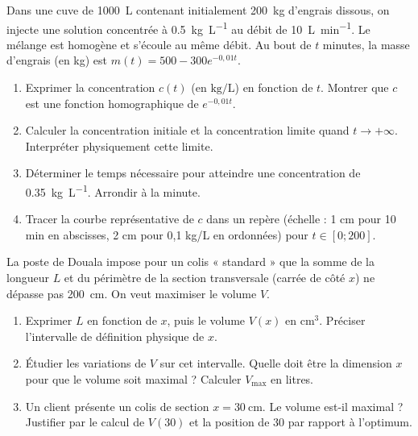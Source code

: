 \documentclass[11pt]{article}
\begin{document}
\begin{exercice}
Dans une cuve de \SI{1000}{\liter} contenant initialement \SI{200}{\kilogram} d'engrais dissous, on injecte une solution concentrée à \SI{0,5}{\kilogram\per\liter} au débit de \SI{10}{\liter\per\minute}. Le mélange est homogène et s'écoule au même débit. Au bout de $t$ minutes, la masse d'engrais (en kg) est $m(t) = 500 - 300e^{-0,01t}$.
\begin{enumerate}
    \item Exprimer la concentration $c(t)$ (en $\text{kg}/\text{L}$) en fonction de $t$. Montrer que $c$ est une fonction homographique de $e^{-0,01t}$.
    \item Calculer la concentration initiale et la concentration limite quand $t \to +\infty$. Interpréter physiquement cette limite.
    \item Déterminer le temps nécessaire pour atteindre une concentration de \SI{0,35}{\kilogram\per\liter}. Arrondir à la minute.
    \item Tracer la courbe représentative de $c$ dans un repère (échelle : 1 cm pour 10 min en abscisses, 2 cm pour 0,1 kg/L en ordonnées) pour $t \in [0; 200]$.
\end{enumerate}
\end{exercice}

\begin{exercice}
La poste de Douala impose pour un colis « standard » que la somme de la longueur $L$ et du périmètre de la section transversale (carrée de côté $x$) ne dépasse pas \SI{200}{\centi\meter}. On veut maximiser le volume $V$.
\begin{enumerate}
    \item Exprimer $L$ en fonction de $x$, puis le volume $V(x)$ en $\text{cm}^3$. Préciser l'intervalle de définition physique de $x$.
    \item Étudier les variations de $V$ sur cet intervalle. Quelle doit être la dimension $x$ pour que le volume soit maximal ? Calculer $V_{\text{max}}$ en litres.
    \item Un client présente un colis de section $x = \SI{30}{\centi\meter}$. Le volume est-il maximal ? Justifier par le calcul de $V(30)$ et la position de 30 par rapport à l'optimum.
\end{enumerate}
\end{exercice}
\end{document}
